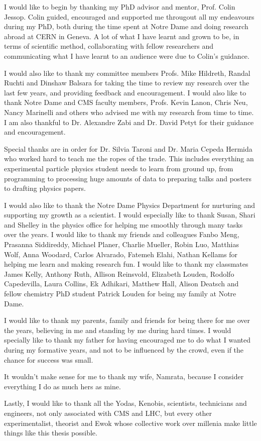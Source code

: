 \documentclass[final,numrefs,sort&compress]{nddiss2e}
\begin{document}
\begin{acknowledge}
  
  I would like to begin by thanking my PhD advisor and mentor, Prof. Colin Jessop. Colin guided, encouraged and supported me througout all my endeavours during my PhD, both during the time spent at Notre Dame and doing research abroad at CERN in Geneva. A lot of what I have learnt and grown to be, in terms of scientific method, collaborating with fellow researchers and communicating what I have learnt to an audience were due to Colin's guidance.

  I would also like to thank my committee members Profs. Mike Hildreth, Randal Ruchti and Dinshaw Balsara for taking the time to review my research over the last few years, and providing feedback and encouragement. I would also like to thank Notre Dame and CMS faculty members, Profs. Kevin Lanon, Chris Neu, Nancy Marinelli and others who advised me with my research from time to time. I am also thankful to Dr. Alexandre Zabi and Dr. David Petyt for their guidance and encouragement.

  Special thanks are in order for Dr. Silvia Taroni and Dr. Maria Cepeda Hermida who worked hard to teach me the ropes  of the trade. This includes everything an experimental particle physics student needs to learn from ground up, from programming to processing huge amounts of data to preparing talks and posters to drafting physics papers.
  
  I would also like to thank the Notre Dame Physics Department for nurturing and supporting my growth as a scientist. I would especially like to thank Susan, Shari and Shelley in the physics office for helping me smoothly through many tasks over the years. I would like to thank my friends and colleagues Fanbo Meng, Prasanna Siddireddy, Michael Planer, Charlie Mueller, Robin Luo, Matthias Wolf, Anna Woodard, Carlos Alvarado, Fatemeh Elahi, Nathan Kellams for helping me learn and making research fun. I would like to thank my classmates James Kelly, Anthony Ruth, Allison Reinsvold, Elizabeth Louden, Rodolfo Capedevilla, Laura Collins, Ek Adhikari, Matthew Hall, Alison Deatsch and fellow chemistry PhD student Patrick Louden for being my family at Notre Dame.

  I would like to thank my parents, family and friends for being there for me over the years, believing in me and standing by me during hard times. I would specially like to thank my father for having encouraged me to do what I wanted during my formative years, and not to be influenced by the crowd, even if the chance for success was small.

  It wouldn't make sense for me to thank my wife, Namrata, because I consider everything I do as much hers as mine.
  
  Lastly, I would like to thank all the Yodas, Kenobis, scientists, technicians and engineers, not only associated with CMS and LHC, but every other experimentalist, theorist and Ewok whose collective work over millenia make little things like this thesis possible.
  
\end{acknowledge}
\end{document}
